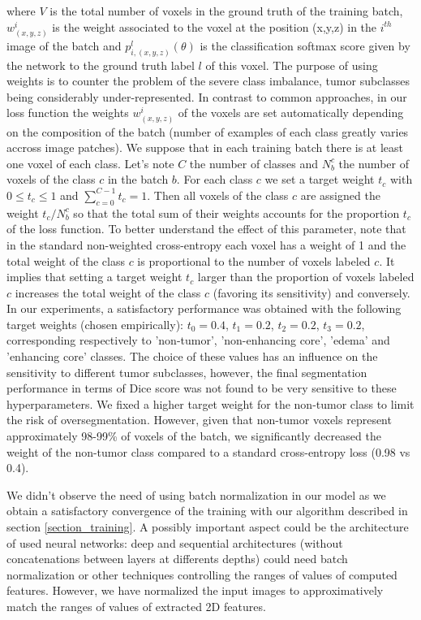 \documentclass[preprint,12pt]{elsarticle}
\begin{document}
where $V$ is the total number of voxels in the ground truth of the training batch, $w_{ (x,y,z)}^i$ is the weight associated to the voxel at the position (x,y,z) in the $i^{th}$ image of the batch and $p^l_{i, (x,y, z)}(\theta)$ is the classification softmax score given by the network to the ground truth label $l$ of this voxel. The purpose of using weights is to counter the problem of the severe class imbalance, tumor subclasses being considerably under-represented. In contrast to common approaches, in our loss function the weights $w_{ (x,y,z)}^i$ of the voxels are set automatically depending on the composition of the batch (number of examples of each class greatly varies accross image patches). We suppose that in each training batch there is at least one voxel of each class. Let's note $C$ the number of classes and $N_b^c$ the number of voxels of the class $c$ in the batch $b$. For each class $c$ we set a target weight $t_c$ with $0 \leq t_c \leq 1$ and $ \sum_{ c=0}^{C-1} t_c= 1$. Then all voxels of the class $c$ are assigned the weight $t_c/N_b^c$ so that the total sum of their weights accounts for the proportion $t_c$ of the loss function. To better understand the effect of this parameter, note that in the standard non-weighted cross-entropy each voxel has a weight of 1 and the total weight of the class $c$ is proportional to the number of voxels labeled $c$. It implies that setting a target weight $t_c$ larger than the proportion of voxels labeled $c$ increases the total weight of the class $c$ (favoring its sensitivity) and conversely. In our experiments, a satisfactory performance was obtained with the following target weights (chosen empirically): ${t_0=0.4}$, $t_1=0.2$, $t_2=0.2$, $t_3=0.2$, corresponding respectively to 'non-tumor', 'non-enhancing core', 'edema' and 'enhancing core' classes. The choice of these values has an influence on the sensitivity to different tumor subclasses, however, the final segmentation performance in terms of Dice score was not found to be very sensitive to these hyperparameters. We fixed a higher target weight for the non-tumor class to limit the risk of oversegmentation. However, given that non-tumor voxels represent approximately 98-99\% of voxels of the batch, we significantly decreased the weight of the non-tumor class compared to a standard cross-entropy loss (0.98 vs 0.4).


We didn't observe the need of using batch normalization \cite{ioffe2015batch} in our model as we obtain a satisfactory convergence of the training with our algorithm described in section \ref{section_training}. A possibly important aspect could be the architecture of used neural networks: deep and sequential architectures (without concatenations between layers at differents depths) could need batch normalization or other techniques controlling the ranges of values of computed features. However, we have normalized the input images to approximatively match the ranges of values of extracted 2D features. 
\end{document}
